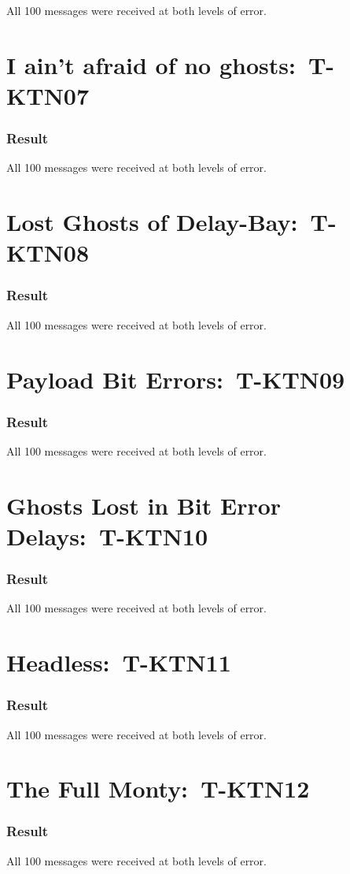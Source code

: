 \documentclass{article}
\begin{document}
All 100 messages were received at both levels of error.

\section{I ain't afraid of no ghosts:\ T-KTN07}

\subsubsection{Result}

All 100 messages were received at both levels of error.

\section{Lost Ghosts of Delay-Bay:\ T-KTN08}

\subsubsection{Result}

All 100 messages were received at both levels of error.

\section{Payload Bit Errors:\ T-KTN09}

\subsubsection{Result}

All 100 messages were received at both levels of error.

\section{Ghosts Lost in Bit Error Delays:\ T-KTN10}

\subsubsection{Result}

All 100 messages were received at both levels of error.

\section{Headless:\ T-KTN11}

\subsubsection{Result}

All 100 messages were received at both levels of error.

\section{The Full Monty:\ T-KTN12}

\subsubsection{Result}

All 100 messages were received at both levels of error.
\end{document}
